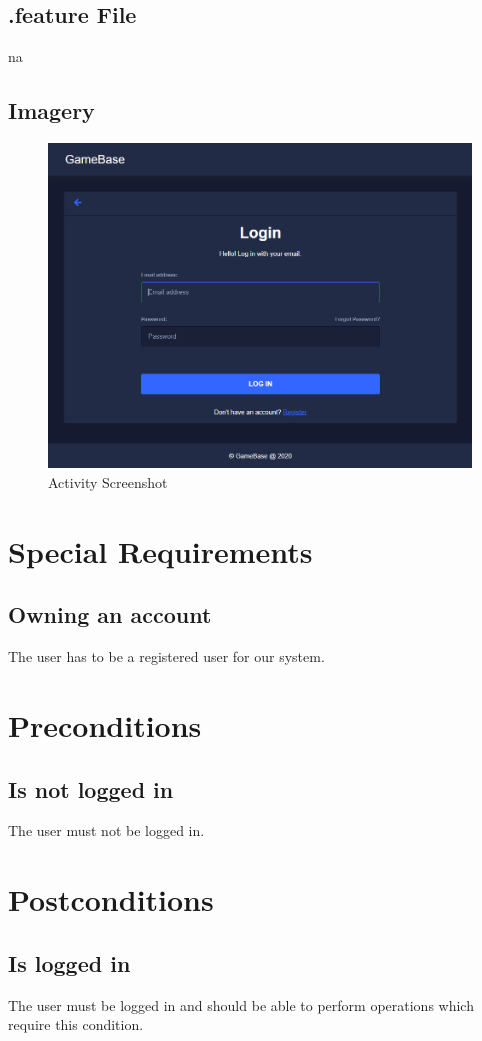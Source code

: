 \documentclass[a4paper,12pt,chapterprefix=false,bibliography=totoc,listof=totoc,book]{scrreprt}
\begin{document}
    \section{.feature File}
    \gls{na}

    \section{Imagery}
    \begin{figure}[H]
        \includegraphics[width=\textwidth]{diagramms/UCLoginUserScreenshot.png}
        \caption{Activity Screenshot}
        \label{fig:screen}
    \end{figure}

    \chapter{Special Requirements}
    \section{Owning an account}
    The user has to be a registered user for our system.

    \chapter{Preconditions}
    \section{Is not logged in}
    The user must not be logged in.

    \chapter{Postconditions}
    \section{Is logged in}
    The user must be logged in and should be able to perform operations which require this condition.
\end{document}

